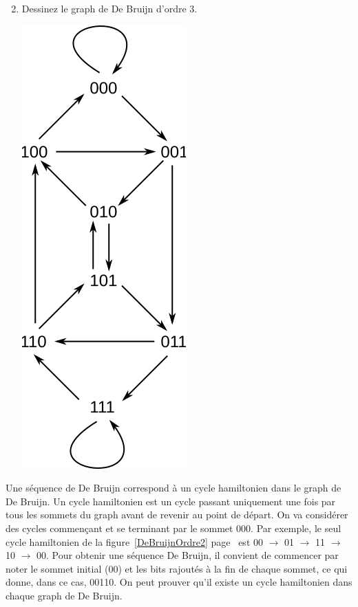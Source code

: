 \documentclass[11pt]{article}
\begin{document}
\begin{enumerate}
\setcounter{enumi}{1}
\item Dessinez le graph de De Bruijn d'ordre 3.


\begin{solution}
\centerline{\includegraphics{order-3}}
\end{solution}
\end{enumerate}


Une séquence de De Bruijn correspond à un cycle hamiltonien dans
le graph de De Bruijn. Un cycle hamiltonien est un cycle passant uniquement une fois par tous les sommets du graph avant de revenir au point de départ.
On va considérer des cycles commençant et se terminant par le sommet 000.
Par exemple, le seul cycle hamiltonien de
la figure~\ref{DeBruijnOrdre2} page~\pageref{DeBruijnOrdre2} est 00
$\rightarrow$ 01 $\rightarrow$ 11 $\rightarrow$ 10 $\rightarrow$ 00.
Pour obtenir une séquence De Bruijn, il convient de commencer par noter
le sommet initial (00) et les bits rajoutés à la fin de chaque sommet,
ce qui donne, dans ce cas, 00110. On peut
prouver qu'il existe un cycle hamiltonien dans chaque graph de De Bruijn.
\end{document}
